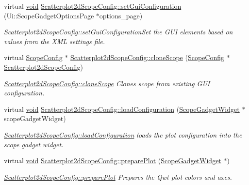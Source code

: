 \begin{DoxyCompactItemize}
\item 
virtual \hyperlink{group___u_a_v_objects_plugin_ga444cf2ff3f0ecbe028adce838d373f5c}{void} \hyperlink{group___scope_plugin_gafe1bd9bbdc9859af7a5d0ad561172a16}{\-Scatterplot2d\-Scope\-Config\-::set\-Gui\-Configuration} (\-Ui\-::\-Scope\-Gadget\-Options\-Page $\ast$options\-\_\-page)
\begin{DoxyCompactList}\small\item\em \-Scatterplot2d\-Scope\-Config\-::set\-Gui\-Configuration\-Set the \-G\-U\-I elements based on values from the \-X\-M\-L settings file. \end{DoxyCompactList}\item 
virtual \hyperlink{class_scope_config}{\-Scope\-Config} $\ast$ \hyperlink{group___scope_plugin_ga71ae0bb572870f67432575772c3093f8}{\-Scatterplot2d\-Scope\-Config\-::clone\-Scope} (\hyperlink{class_scope_config}{\-Scope\-Config} $\ast$\hyperlink{class_scatterplot2d_scope_config}{\-Scatterplot2d\-Scope\-Config})
\begin{DoxyCompactList}\small\item\em \hyperlink{group___scope_plugin_ga71ae0bb572870f67432575772c3093f8}{\-Scatterplot2d\-Scope\-Config\-::clone\-Scope} \-Clones scope from existing \-G\-U\-I configuration. \end{DoxyCompactList}\item 
virtual \hyperlink{group___u_a_v_objects_plugin_ga444cf2ff3f0ecbe028adce838d373f5c}{void} \hyperlink{group___scope_plugin_ga33b7752470b6c5d32b9aaf1b95faf0f7}{\-Scatterplot2d\-Scope\-Config\-::load\-Configuration} (\hyperlink{class_scope_gadget_widget}{\-Scope\-Gadget\-Widget} $\ast$scope\-Gadget\-Widget)
\begin{DoxyCompactList}\small\item\em \hyperlink{group___scope_plugin_ga33b7752470b6c5d32b9aaf1b95faf0f7}{\-Scatterplot2d\-Scope\-Config\-::load\-Configuration} loads the plot configuration into the scope gadget widget. \end{DoxyCompactList}\item 
virtual \hyperlink{group___u_a_v_objects_plugin_ga444cf2ff3f0ecbe028adce838d373f5c}{void} \hyperlink{group___scope_plugin_ga7ff8815549e33c472a7ada6080401b38}{\-Scatterplot2d\-Scope\-Config\-::prepare\-Plot} (\hyperlink{class_scope_gadget_widget}{\-Scope\-Gadget\-Widget} $\ast$)
\begin{DoxyCompactList}\small\item\em \hyperlink{group___scope_plugin_ga7ff8815549e33c472a7ada6080401b38}{\-Scatterplot2d\-Scope\-Config\-::prepare\-Plot} \-Prepares the \-Qwt plot colors and axes. \end{DoxyCompactList}\item 

\end{DoxyCompactItemize}
